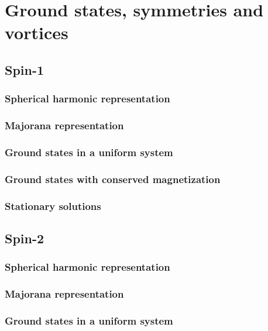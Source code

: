 \chapter{Ground states, symmetries and vortices}

\section{Spin-1}

\subsection{Spherical harmonic representation}

\subsection{Majorana representation}

\subsection{Ground states in a uniform system}

\subsection{Ground states with conserved magnetization}

\subsection{Stationary solutions}

\section{Spin-2}

\subsection{Spherical harmonic representation}

\subsection{Majorana representation}

\subsection{Ground states in a uniform system}


